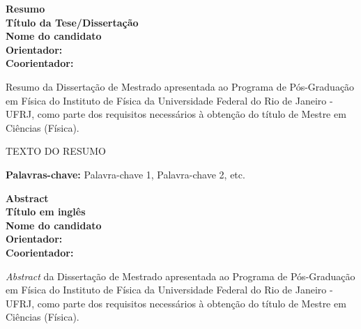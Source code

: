 \documentclass[brazil,12pt,a4paper,openany]{book}
\begin{document}




\newpage

\noindent

\vspace*{20pt}
\begin{center}
{\LARGE\bf Resumo}\\
\vspace{15pt}
{\Large\bf Título da Tese/Dissertação}\\
\vspace{6pt}
{\bf Nome do candidato}\\
\vspace{12pt}
{\bf Orientador: }\\
{\bf Coorientador: }\\
\vspace{20pt}
\parbox{14cm}{Resumo da Dissertação de Mestrado apresentada ao Programa de Pós-Graduação em Física do Instituto de Física da Universidade Federal do Rio de Janeiro - UFRJ, como parte dos requisitos necessários à obtenção do título de Mestre em Ciências (Física).}
\end{center}
\vspace*{35pt}

TEXTO DO RESUMO

\vspace{15pt}

\textbf{Palavras-chave:} Palavra-chave 1,  Palavra-chave 2, etc.





\newpage

\noindent

\vspace*{20pt}
\begin{center}
{\LARGE\bf Abstract}\\
\vspace{15pt}
{\Large\bf Título em inglês}\\
\vspace{6pt}
{\bf Nome do candidato}\\
\vspace{12pt}
{\bf Orientador: }\\
{\bf Coorientador: }\\
\vspace{20pt}
\parbox{14cm}{\emph{Abstract} da Dissertação de Mestrado apresentada ao Programa de Pós-Graduação em Física do Instituto de Física da Universidade Federal do Rio de Janeiro - UFRJ, como parte dos requisitos necessários à obtenção do título de Mestre em Ciências (Física).} %
\end{center}
\vspace*{35pt}
\end{document}

